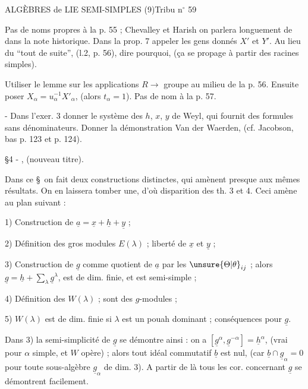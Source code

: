 ALGÈBRES de LIE SEMI-SIMPLES (9)\hfill Tribu n$^\circ$ 59

Pas de noms propres à la p. 55 ; Chevalley et Harish on parlera longuement
de dans la note historique. Dans la prop. 7 appeler les gens donnés $X'$ et $Y'$.
Au lieu du ``tout de suite'', (l.2, p. 56), dire pourquoi, (ça se propage à partir
des racines simples).

Utiliser le lemme sur les applications $R\longrightarrow$ groupe au milieu de la p. 56.
Ensuite poser $X_\alpha=u_\alpha^{-1}X'_\alpha$, (alors $t_\alpha=1$). Pas de nom à la p. 57.

\uline{} - Dans l'exer. 3 donner le système des $h$, $x$, $y$ de Weyl, qui fournit des
formules sans dénominateurs. Donner la démonstration Van der Waerden, (cf.
Jacobson, bas p. 123 et p. 124).

\S4 - , (nouveau titre).

Dans ce \S\ on fait deux constructions distinctes, qui amènent presque aux
mêmes résultats. On en laissera tomber une, d'où disparition des th. 3 et 4.
Ceci amène au plan suivant :

1) Construction de $\underline a=\underline x+\underline h+\underline y$ ;

2) Définition des gros modules $E(\lambda)$ ; liberté de $\underline x$ et $\underline y$ ;

3) Construction de $\underline g$ comme quotient de $\underline a$ par les $\unsure{\Theta|\theta}_{ij}$ ; alors
$\underline g=\underline h+\sum_\lambda\underline g^\lambda$,
est de dim. finie, et est semi-simple ;

4) Définition des $W(\lambda)$ ; sont des $g$-modules ;

5) $W(\lambda)$ est de dim. finie si $\lambda$ est un pouah dominant ; conséquences pour $\underline g$.

Dans 3) la semi-simplicité de $\underline g$ se démontre ainsi : on a
$[\underline g^\alpha,\underline g^{-\alpha}]=\underline h^\alpha$,
(vrai pour $\alpha$ simple, et $W$ opère) ; alors tout idéal commutatif $\underline b$ est nul, (car
$\underline b\cap\underline g_\alpha=0$ pour toute sous-algèbre $\underline g_\alpha$ de dim. 3). A partir de là tous les cor.
concernant $\underline g$ se démontrent facilement.

